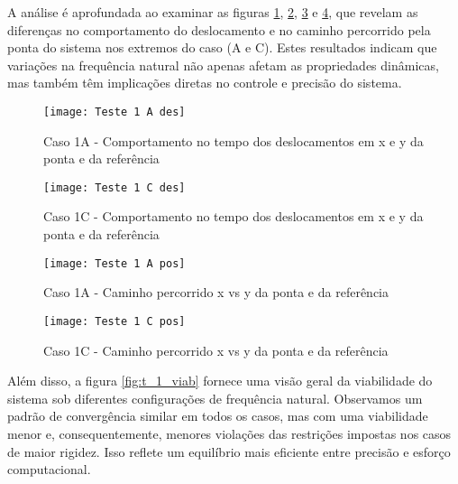 A análise é aprofundada ao examinar as figuras \ref{fig:t_1a_des}, \ref{fig:t_1c_des}, \ref{fig:t_1a_pos} e \ref{fig:t_1c_pos}, que revelam as diferenças no comportamento do deslocamento e no caminho percorrido pela ponta do sistema nos extremos do caso (A e C). Estes resultados indicam que variações na frequência natural não apenas afetam as propriedades dinâmicas, mas também têm implicações diretas no controle e precisão do sistema.

\begin{figure}[H]
    \begin{center}
    \caption{Caso 1A - Comportamento no tempo dos deslocamentos em x e y da ponta e da referência}
    \texttt{[image: Teste 1 A des]}
    \label{fig:t_1a_des}
    \end{center}
\end{figure}

\begin{figure}[H]
    \begin{center}
    \caption{Caso 1C - Comportamento no tempo dos deslocamentos em x e y da ponta e da referência}
    \texttt{[image: Teste 1 C des]}
    \label{fig:t_1c_des}
    \end{center}
\end{figure}

\begin{figure}[H]
    \begin{center}
    \caption{Caso 1A - Caminho percorrido x vs y da ponta e da referência}
    \texttt{[image: Teste 1 A pos]}
    \label{fig:t_1a_pos}
    \end{center}
\end{figure}

\begin{figure}[H]
    \begin{center}
    \caption{Caso 1C - Caminho percorrido x vs y da ponta e da referência}
    \texttt{[image: Teste 1 C pos]}
    \label{fig:t_1c_pos}
    \end{center}
\end{figure}

Além disso, a figura \ref{fig:t_1_viab} fornece uma visão geral da viabilidade do sistema sob diferentes configurações de frequência natural. Observamos um padrão de convergência similar em todos os casos, mas com uma viabilidade menor e, consequentemente, menores violações das restrições impostas nos casos de maior rigidez. Isso reflete um equilíbrio mais eficiente entre precisão e esforço computacional.

